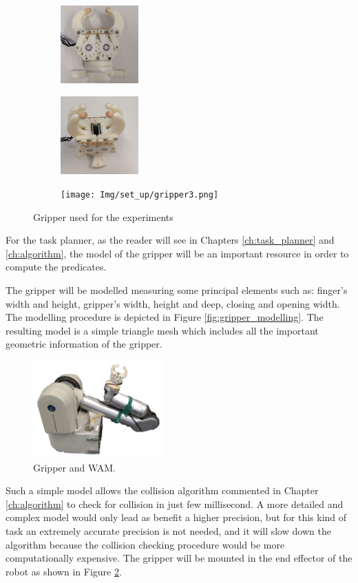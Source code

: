 \begin{figure}[htp]
\centering
\begin{subfigure}[b]{0.3\textwidth}
\centering
\includegraphics[height=3cm]{Img/set_up/gripper1.png}
\end{subfigure}
\begin{subfigure}[b]{0.3\textwidth}
\centering
\includegraphics[height=3cm]{Img/set_up/gripper2.png}
\end{subfigure}
\begin{subfigure}[b]{0.3\textwidth}
\centering
\texttt{[image: Img/set\_up/gripper3.png]}
\end{subfigure}
\caption{Gripper used for the experiments}\label{fig:gripper_general}
\end{figure}

For the task planner, as the reader will see in Chapters \ref{ch:task_planner} and \ref{ch:algorithm}, the model of the gripper will be an important resource 
in order to compute the predicates. 

The gripper will be modelled measuring some principal elements such as: finger's width and height, gripper's width, height and deep, closing and opening width. The modelling procedure is depicted in Figure \ref{fig:gripper_modelling}. The resulting model is a simple triangle mesh which includes all the important geometric information of the gripper.
\begin{figure}[h]
\centering
\includegraphics[width=5.0cm]{Img/set_up/wam_gripper2.png}
\caption{Gripper and WAM.}\label{fig:wam_gripper}
\end{figure}
Such a simple model allows the collision algorithm commented in Chapter \ref{ch:algorithm} to check for collision in just few millisecond. 
A more detailed and complex model would only lead as benefit a higher precision, but for this kind of task an extremely accurate precision is not needed, and it will slow down the algorithm because the collision checking procedure would be more computationally expensive. 
The gripper will be mounted in the end effector of the robot as shown in Figure \ref{fig:wam_gripper}. 


